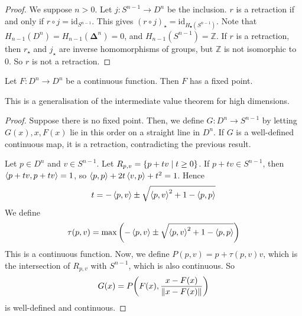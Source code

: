 \begin{proof}
	We suppose \( n > 0 \).
	Let \( j \colon S^{n-1} \to D^n \) be the inclusion.
	\( r \) is a retraction if and only if \( r \circ j = \mathrm{id}_{S^{n-1}} \).
	This gives \( (r \circ j)_\star = \mathrm{id}_{H_\bullet(S^{n-1})} \).
	Note that \( H_{n-1}(D^n) = H_{n-1}(\bm\Delta^n) = 0 \), and \( H_{n-1}(S^{n-1}) = \mathbb Z \).
	If \( r \) is a retraction, then \( r_\star \) and \( j_\star \) are inverse homomorphisms of groups, but \( \mathbb Z \) is not isomorphic to \( 0 \).
	So \( r \) is not a retraction.
\end{proof}
\begin{theorem}
	Let \( F \colon D^n \to D^n \) be a continuous function.
	Then \( F \) has a fixed point.
\end{theorem}
\begin{remark}
	This is a generalisation of the intermediate value theorem for high dimensions.
\end{remark}
\begin{proof}
	Suppose there is no fixed point.
	Then, we define \( G \colon D^n \to S^{n-1} \) by letting \( G(x), x, F(x) \) lie in this order on a straight line in \( D^n \).
	If \( G \) is a well-defined continuous map, it is a retraction, contradicting the previous result.

	Let \( p \in D^n \) and \( v \in S^{n-1} \).
	Let \( R_{p,v} = \qty{p + tv \mid t \geq 0} \).
	If \( p + tv \in S^{n-1} \), then \( \left\langle{p + tv, p + tv}\right\rangle = 1 \), so \( \left\langle{p,p}\right\rangle + 2t \left\langle{v,p}\right\rangle + t^2 = 1 \).
	Hence
	\[ t = -\left\langle{p,v}\right\rangle \pm \sqrt{\left\langle{p,v}\right\rangle^2 + 1 - \left\langle{p,p}\right\rangle} \]
	We define
	\[ \tau(p,v) = \max\qty(-\left\langle{p,v}\right\rangle \pm \sqrt{\left\langle{p,v}\right\rangle^2 + 1 - \left\langle{p,p}\right\rangle}) \]
	This is a continuous function.
	Now, we define \( P(p,v) = p + \tau(p,v) v \), which is the intersection of \( R_{p,v} \) with \( S^{n-1} \), which is also continuous.
	So
	\[ G(x) = P\qty(F(x), \frac{x - F(x)}{\norm{x - F(x)}}) \]
	is well-defined and continuous.
\end{proof}

